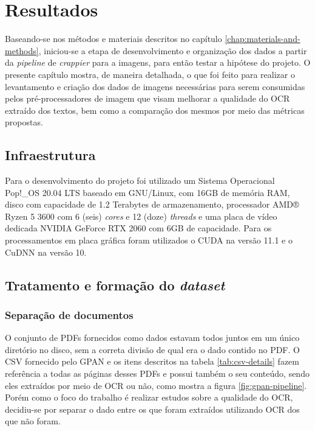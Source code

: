 \chapter[Resultados]{Resultados}

Baseando-se nos métodos e materiais descritos no capítulo \ref{chap:materials-and-methods}, iniciou-se a etapa de desenvolvimento e organização dos dados a partir da \textit{pipeline} de \textit{crappier} para a imagens, para então testar a hipótese do projeto. O presente capítulo mostra, de maneira detalhada, o que foi feito para realizar o levantamento e criação dos dados de imagens necessárias para serem consumidas pelos pré-processadores de imagem que visam melhorar a qualidade do OCR extraído dos textos, bem como a comparação dos mesmos por meio das métricas propostas.

\section{Infraestrutura}

Para o desenvolvimento do projeto foi utilizado um Sistema Operacional  Pop!\_OS 20.04 LTS baseado em GNU/Linux, com 16GB de memória RAM, disco com capacidade de 1.2 Terabytes de armazenamento, processador AMD® Ryzen 5 3600 com 6 (seis) \textit{cores} e 12 (doze) \textit{threads} e uma placa de vídeo dedicada NVIDIA GeForce RTX 2060 com 6GB de capacidade. Para os processamentos em placa gráfica foram utilizados o CUDA na versão 11.1 e o CuDNN na versão 10.


\section{Tratamento e formação do \textit{dataset}}

\subsection{Separação de documentos}
O conjunto de PDFs fornecidos como dados estavam todos juntos em um único diretório no disco, sem a correta divisão de qual era o dado contido no PDF. O CSV fornecido pelo GPAN e os itens descritos na tabela \ref{tab:csv-details} fazem referência a todas as páginas desses PDFs e possui também o seu conteúdo, sendo eles extraídos por meio de OCR ou não, como mostra a figura \ref{fig:gpan-pipeline}. Porém como o foco do trabalho é realizar estudos sobre a qualidade do OCR, decidiu-se por separar o dado entre os que foram extraídos utilizando OCR dos que não foram.

